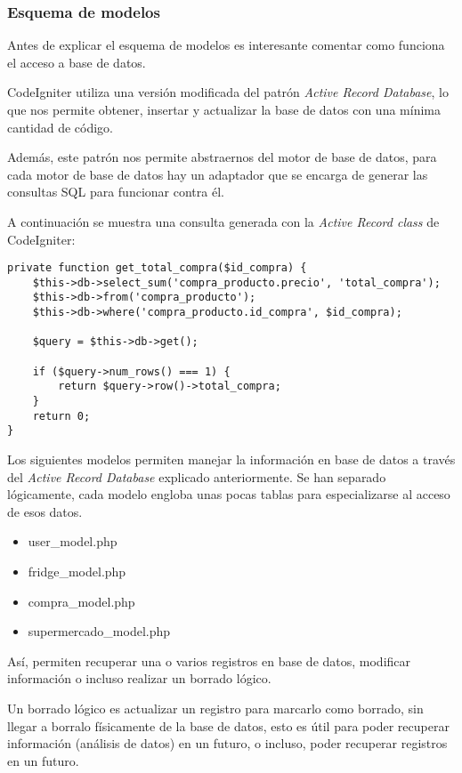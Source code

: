     \subsubsection{Esquema de modelos}

        Antes de explicar el esquema de modelos es interesante comentar como funciona el acceso a base de datos.

        CodeIgniter utiliza una versión modificada del patrón \emph{Active Record Database}, lo que nos permite obtener, insertar y actualizar la base de datos con una mínima cantidad de código.

        Además, este patrón nos permite abstraernos del motor de base de datos, para cada motor de base de datos hay un adaptador que se encarga de generar las consultas SQL para funcionar contra él.

        A continuación se muestra una consulta generada con la \emph{Active Record class} de CodeIgniter:

        \begin{lstlisting}
private function get_total_compra($id_compra) {
    $this->db->select_sum('compra_producto.precio', 'total_compra');
    $this->db->from('compra_producto');
    $this->db->where('compra_producto.id_compra', $id_compra);

    $query = $this->db->get();

    if ($query->num_rows() === 1) {
        return $query->row()->total_compra;
    }
    return 0;
}
        \end{lstlisting}

        Los siguientes modelos permiten manejar la información en base de datos a través del \emph{Active Record Database} explicado anteriormente. Se han separado lógicamente, cada modelo engloba unas pocas tablas para especializarse al acceso de esos datos.

        \begin{itemize}
            \item user\_model.php
            \item fridge\_model.php
            \item compra\_model.php
            \item supermercado\_model.php
        \end{itemize}

        Así, permiten recuperar una o varios registros en base de datos, modificar información o incluso realizar un borrado lógico.

        Un borrado lógico es actualizar un registro para marcarlo como borrado, sin llegar a borralo físicamente de la base de datos, esto es útil para poder recuperar información (análisis de datos) en un futuro, o incluso, poder recuperar registros en un futuro.